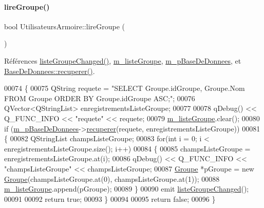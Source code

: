 \mbox{\label{class_utilisateurs_armoire_aeadd41da356116c6e393d832e2b819e9}} 
\paragraph{\texorpdfstring{lire\+Groupe()}{lireGroupe()}}
{\footnotesize\ttfamily bool Utilisateurs\+Armoire\+::lire\+Groupe (\begin{DoxyParamCaption}{ }\end{DoxyParamCaption})}



Références \hyperlink{class_utilisateurs_armoire_ae8cbb67d285658aadff801e64f43fd97}{liste\+Groupe\+Changed()}, \hyperlink{class_utilisateurs_armoire_a85558a0f373c06315c3c5f2e4e9e660c}{m\+\_\+liste\+Groupe}, \hyperlink{class_utilisateurs_armoire_ac43b4894f5036117d044ad2d22b09318}{m\+\_\+p\+Base\+De\+Donnees}, et \hyperlink{class_base_de_donnees_a77539baad389f5acf754cd2cd452403e}{Base\+De\+Donnees\+::recuperer()}.


\begin{DoxyCode}
00074 \{
00075     QString requete = \textcolor{stringliteral}{"SELECT Groupe.idGroupe, Groupe.Nom FROM Groupe ORDER BY Groupe.idGroupe ASC;"};
00076     QVector<QStringList> enregistrementsListeGroupe;
00077 
00078     qDebug() << Q\_FUNC\_INFO << \textcolor{stringliteral}{"requete"} << requete;
00079     \hyperlink{class_utilisateurs_armoire_a85558a0f373c06315c3c5f2e4e9e660c}{m\_listeGroupe}.clear();
00080     \textcolor{keywordflow}{if} (\hyperlink{class_utilisateurs_armoire_ac43b4894f5036117d044ad2d22b09318}{m\_pBaseDeDonnees}->\hyperlink{class_base_de_donnees_a77539baad389f5acf754cd2cd452403e}{recuperer}(requete, enregistrementsListeGroupe))
00081     \{
00082         QStringList champsListeGroupe;
00083         \textcolor{keywordflow}{for}(\textcolor{keywordtype}{int} i = 0; i < enregistrementsListeGroupe.size(); i++)
00084         \{
00085             champsListeGroupe = enregistrementsListeGroupe.at(i);
00086             qDebug() << Q\_FUNC\_INFO << \textcolor{stringliteral}{"champsListeGroupe"} << champsListeGroupe;
00087             \hyperlink{class_groupe}{Groupe} *pGroupe = \textcolor{keyword}{new} \hyperlink{class_groupe}{Groupe}(champsListeGroupe.at(0), champsListeGroupe.at(1));
00088             \hyperlink{class_utilisateurs_armoire_a85558a0f373c06315c3c5f2e4e9e660c}{m\_listeGroupe}.append(pGroupe);
00089         \}
00090         emit \hyperlink{class_utilisateurs_armoire_ae8cbb67d285658aadff801e64f43fd97}{listeGroupeChanged}();
00091 
00092         \textcolor{keywordflow}{return} \textcolor{keyword}{true};
00093     \}
00094 
00095     \textcolor{keywordflow}{return} \textcolor{keyword}{false};
00096 \}
\end{DoxyCode}
\mbox{\label{class_utilisateurs_armoire_a952931c38642273c5e959edb69706144}} 
